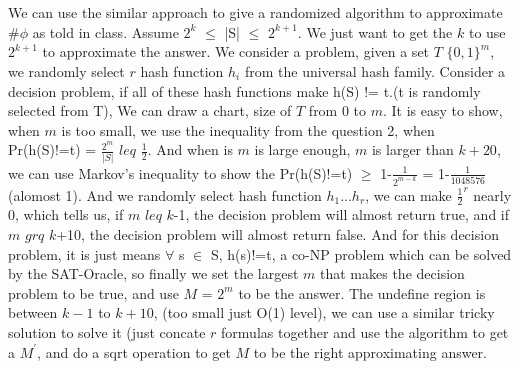 \documentclass[11pt]{article}
\begin{document}
\part{}
We can use the similar approach to give a randomized algorithm to approximate \#$\phi$ as told in class. Assume $2^{k}$ $\leq$ |S| $\leq$ $2^{k+1}$. We just want to get the $k$ to use $2^{k+1}$ to approximate the answer. We consider a problem, given a set $T$ $\{0,1\}^{m}$, we randomly select $r$ hash function $h_{i}$ from the universal hash family. Consider a decision problem, if all of these hash functions make h(S) != t.(t is randomly selected from T), We can draw a chart, size of $T$ from 0 to $m$. It is easy to show, when $m$ is too small, we use the inequality from the question 2, when Pr(h(S)!=t) = $\frac{2^{m}}{|S|}$ $leq$ $\frac{1}{2}$. And when is $m$ is large enough, $m$ is larger than $k+20$, we can use Markov's inequality to show the Pr(h(S)!=t) $\geq$ 1-$\frac{1}{2^{m-k}}$ = 1-$\frac{1}{1048576}$ (alomost 1). And we randomly select hash function $h_{1}...h_{r}$, we can make $\frac{1}{2}^{r}$ nearly 0, which tells us, if $m$ $leq$ $k$-1, the decision problem will almost return true, and if $m$ $grq$ $k$+10, the decision problem will almost return false. And for this decision problem, it is just means $\forall$ s $\in$ S, h(s)!=t, a co-NP problem which can be solved by the SAT-Oracle, so finally we set the largest $m$ that makes the decision problem to be true, and use $M$ = $2^{m}$ to be the answer. The undefine region is between $k-1$ to $k+10$, (too small just O(1) level), we can use a similar tricky solution to solve it (just concate $r$ formulas together and use the algorithm to get a $M^{'}$, and do a sqrt operation to get $M$ to be the right approximating answer.
\end{document}
